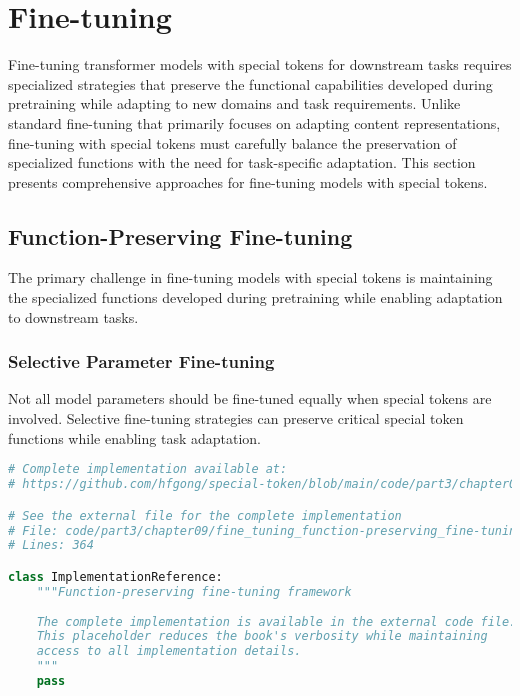 
\section{Fine-tuning}

Fine-tuning transformer models with special tokens for downstream tasks requires specialized strategies that preserve the functional capabilities developed during pretraining while adapting to new domains and task requirements. Unlike standard fine-tuning that primarily focuses on adapting content representations, fine-tuning with special tokens must carefully balance the preservation of specialized functions with the need for task-specific adaptation. This section presents comprehensive approaches for fine-tuning models with special tokens.

\subsection{Function-Preserving Fine-tuning}

The primary challenge in fine-tuning models with special tokens is maintaining the specialized functions developed during pretraining while enabling adaptation to downstream tasks.

\subsubsection{Selective Parameter Fine-tuning}

Not all model parameters should be fine-tuned equally when special tokens are involved. Selective fine-tuning strategies can preserve critical special token functions while enabling task adaptation.

\begin{lstlisting}[language=Python, caption={Function-preserving fine-tuning framework}]
# Complete implementation available at:
# https://github.com/hfgong/special-token/blob/main/code/part3/chapter09/fine_tuning_function-preserving_fine-tunin.py

# See the external file for the complete implementation
# File: code/part3/chapter09/fine_tuning_function-preserving_fine-tunin.py
# Lines: 364

class ImplementationReference:
    """Function-preserving fine-tuning framework
    
    The complete implementation is available in the external code file.
    This placeholder reduces the book's verbosity while maintaining
    access to all implementation details.
    """
    pass
\end{lstlisting}

